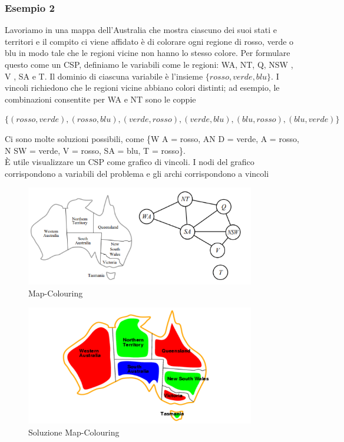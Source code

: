 \subsubsection{Esempio 2}
Lavoriamo in una mappa dell’Australia che mostra ciascuno dei suoi stati e territori e il compito ci viene affidato è di colorare ogni regione di rosso, verde o blu in modo tale che le regioni vicine non hanno lo stesso colore. Per formulare questo come un CSP, definiamo le variabili come le regioni: WA, NT, Q, NSW , V , SA e T. Il dominio di ciascuna variabile è l’insieme $\{rosso, verde, blu\}$. I vincoli richiedono che le regioni vicine abbiano colori distinti; ad esempio, le combinazioni consentite per WA e NT sono le coppie
\begin{center}
    $\{(rosso, verde), (rosso, blu), (verde, rosso), (verde, blu), (blu, rosso), (blu, verde)\}$ 
\end{center}
Ci sono molte soluzioni possibili, come \{W A = rosso, AN D = verde, A = rosso, N SW = verde, V = rosso, SA = blu, T = rosso\}. 
\\È utile visualizzare un CSP come grafico di vincoli. I nodi del grafico corrispondono a variabili del problema e gli archi corrispondono a vincoli
\begin{figure}[htp]
	\centering
    \includegraphics[width=10cm, keepaspectratio]{img/Cap1/map-coloring1.png}
    \caption{Map-Colouring}
\end{figure}
\begin{figure}[htp]
	\centering
    \includegraphics[width=10cm, keepaspectratio]{img/Cap1/map-coloring2.png}
    \caption{Soluzione Map-Colouring}
\end{figure}

